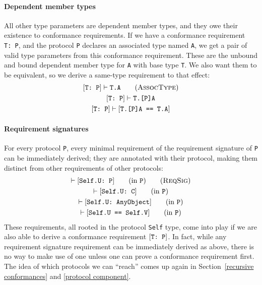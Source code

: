 \documentclass[../generics]{subfiles}
\begin{document}
\paragraph{Dependent member types} All other type parameters are dependent member types, and they owe their existence to conformance requirements. If we have a conformance requirement \texttt{T:~P}, and the protocol \texttt{P} declares an associated type named \texttt{A}, we get a pair of valid type parameters from this conformance requirement. These are the unbound and bound dependent member type for \texttt{A} with base type \texttt{T}. We also want them to be equivalent, so we derive a same-type requirement to that effect:
\begin{gather*}
\ConfReq{T}{P}\vdash\texttt{T.A}\tag{\textsc{AssocType}}\\
\ConfReq{T}{P}\vdash\texttt{T.[P]A}\\
\ConfReq{T}{P}\vdash\FormalReq{T.[P]A == T.A}
\end{gather*}

\paragraph{Requirement signatures}
 For every protocol \texttt{P}, every minimal requirement of the requirement signature of \texttt{P} can be immediately derived; they are annotated with their protocol, making them distinct from other requirements of other protocols:
\begin{gather*}
\vdash\ConfReq{Self.U}{P}\qquad\mbox{(in \texttt{P})}\tag{\textsc{ReqSig}}\\
\vdash\ConfReq{Self.U}{C}\qquad\mbox{(in \texttt{P})}\\
\vdash\ConfReq{Self.U}{AnyObject}\qquad\mbox{(in \texttt{P})}\\
\vdash\FormalReq{Self.U == Self.V}\qquad\mbox{(in \texttt{P})}
\end{gather*}
These requirements, all rooted in the protocol \texttt{Self} type, come into play if we are also able to derive a conformance requirement $[\texttt{T:~P}]$. In fact, while any requirement signature requirement can be immediately derived as above, there is no way to make use of one unless one can prove a conformance requirement first. The idea of which protocols we can ``reach'' comes up again in Section~\ref{recursive conformances} and \ref{protocol component}.
\end{document}

